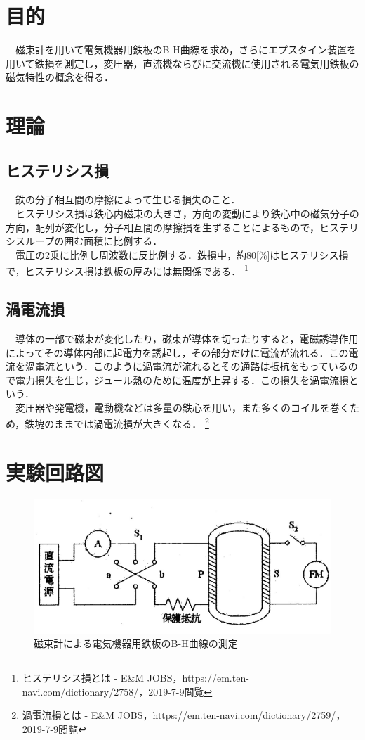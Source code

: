 

\pagestyle{fancy}
\section{目的}
　磁束計を用いて電気機器用鉄板のB-H曲線を求め，さらにエプスタイン装置を用いて鉄損を測定し，変圧器，直流機ならびに交流機に使用される電気用鉄板の磁気特性の概念を得る．\\

\section{理論}
\subsection{ヒステリシス損}
　鉄の分子相互間の摩擦によって生じる損失のこと．\\
　ヒステリシス損は鉄心内磁束の大きさ，方向の変動により鉄心中の磁気分子の方向，配列が変化し，分子相互間の摩擦損を生ずることによるもので，ヒステリシスループの囲む面積に比例する．\\
　電圧の2乗に比例し周波数に反比例する．鉄損中，約80[\%]はヒステリシス損で，ヒステリシス損は鉄板の厚みには無関係である．
\footnote{ヒステリシス損とは - E\&M JOBS，https://em.ten-navi.com/dictionary/2758/，2019-7-9閲覧}

\subsection{渦電流損}
　導体の一部で磁束が変化したり，磁束が導体を切ったりすると，電磁誘導作用によってその導体内部に起電力を誘起し，その部分だけに電流が流れる．この電流を渦電流という．このように渦電流が流れるとその通路は抵抗をもっているので電力損失を生じ，ジュール熱のために温度が上昇する．この損失を渦電流損という．\\
　変圧器や発電機，電動機などは多量の鉄心を用い，また多くのコイルを巻くため，鉄塊のままでは渦電流損が大きくなる．
\footnote{渦電流損とは - E\&M JOBS，https://em.ten-navi.com/dictionary/2759/，2019-7-9閲覧}

\section{実験回路図}
\begin{figure}[H]
  \centering
  \includegraphics[width=13cm]{./fig/1.png}
  \caption{磁束計による電気機器用鉄板のB-H曲線の測定}
\end{figure}

